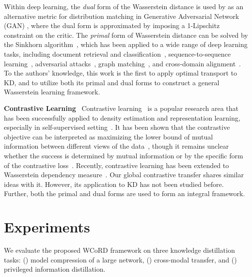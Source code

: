 \documentclass[final]{cvpr}
\theoremstyle{definition}
\begin{document}
Within deep learning, the \emph{dual} form of the Wasserstein distance is used by \cite{wgan, gulrajani2017improved} as an alternative metric for distribution matching in Generative Adversarial Network (GAN) \cite{goodfellow2014generative}, where the dual form is approximated by imposing a 1-Lipschitz constraint on the critic. 
The \emph{primal} form of Wasserstein distance can be solved by the Sinkhorn algorithm~\cite{cuturi2013sinkhorn}, which has been applied to a wide range of deep learning tasks, including document retrieval and classification~\cite{kusner2015word}, sequence-to-sequence learning~\cite{chen2019improving}, adversarial attacks~\cite{wong2019wasserstein}, graph matching~\cite{xu2019gromov}, and cross-domain alignment~\cite{chen2020graph}.
To the authors' knowledge, this work is the first to apply optimal transport to KD, and to utilize both its primal and dual forms to construct a general Wasserstein learning framework. 




\vspace{5pt}
\noindent\textbf{Contrastive Learning} \,
Contrastive learning~\cite{gutmann2010noise,arora2019theoretical} is a popular research area that has been successfully applied to density estimation and representation learning, especially in self-supervised setting~\cite{he2019momentum,chen2020simple}. It has been shown that the contrastive objective can be interpreted as maximizing the lower bound of mutual information between different views of the data~\cite{hjelm2018learning,oord2018representation,bachman2019learning,henaff2019data}, though it remains unclear whether the success is determined by mutual information or by the specific form of the contrastive loss~\cite{tschannen2019mutual}.  Recently, contrastive learning has been extended to Wasserstein dependency measure~\cite{ozair2019wasserstein}. Our global  contrastive transfer shares similar ideas with it. However, its application to KD has not been studied before. Further, both the primal and dual forms are used to form an integral framework.

\section{Experiments}
We evaluate the proposed WCoRD framework on three knowledge distillation tasks: () model compression of a large network, () cross-modal transfer, and () privileged information distillation. 
\end{document}
